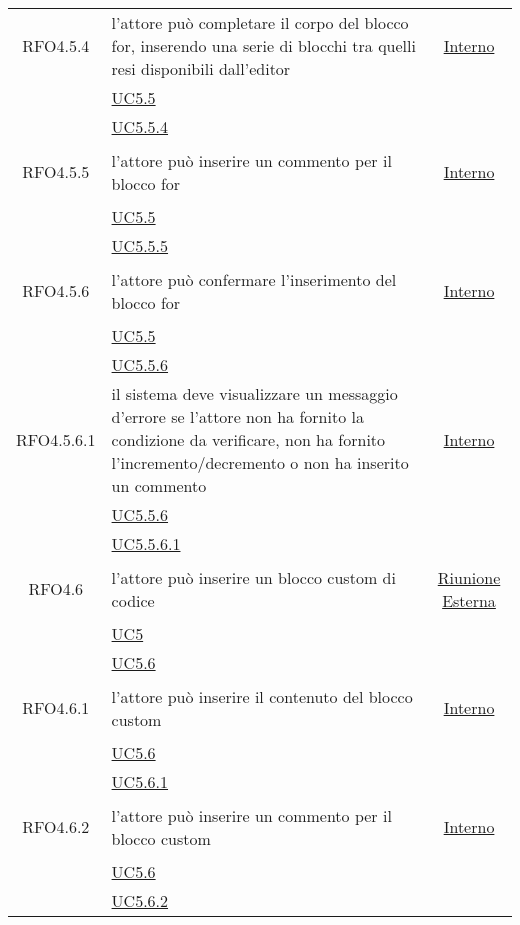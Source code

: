 \begin{longtable}{|c|>{\centering}m{7cm}|c|}
\hypertarget{RFO4.5.4}{RFO4.5.4} & l'attore può completare il corpo del blocco for, inserendo una serie di blocchi tra quelli resi disponibili dall'editor & \hyperlink{Interno}{Interno}\\
& \hyperref[UC5.5]{UC5.5}\\
& \hyperref[UC5.5.4]{UC5.5.4}\\ \hline

\hypertarget{RFO4.5.5}{RFO4.5.5} & l’attore può inserire un commento per il blocco for & \hyperlink{Interno}{Interno}\\
& \hyperref[UC5.5]{UC5.5}\\
& \hyperref[UC5.5.5]{UC5.5.5}\\ \hline

\hypertarget{RFO4.5.6}{RFO4.5.6} & l’attore può confermare l'inserimento del blocco for &  \hyperlink{Interno}{Interno}\\
& \hyperref[UC5.5]{UC5.5}\\
& \hyperref[UC5.5.6]{UC5.5.6}\\ \hline

\hypertarget{RFO4.5.6.1}{RFO4.5.6.1} & il sistema deve visualizzare un messaggio d'errore se l'attore non ha fornito la condizione da verificare, non ha fornito l'incremento/decremento o non ha inserito un commento & \hyperlink{Interno}{Interno}\\
& \hyperref[UC5.5.6]{UC5.5.6}\\
& \hyperref[UC5.5.6.1]{UC5.5.6.1}\\ \hline

\hypertarget{RFO4.6}{RFO4.6} & l'attore può inserire un blocco custom di codice & \hyperlink{Riunione Esterna}{Riunione Esterna}\\
& \hyperref[UC5]{UC5}\\
& \hyperref[UC5.6]{UC5.6}\\ \hline

\hypertarget{RFO4.6.1}{RFO4.6.1} & l'attore può inserire il contenuto del blocco custom & \hyperlink{Interno}{Interno}\\
& \hyperref[UC5.6]{UC5.6}\\
& \hyperref[UC5.6.1]{UC5.6.1}\\ \hline

\hypertarget{RFO4.6.2}{RFO4.6.2} & l’attore può inserire un commento per il blocco custom & \hyperlink{Interno}{Interno}\\
& \hyperref[UC5.6]{UC5.6}\\
& \hyperref[UC5.6.2]{UC5.6.2}\\ \hline


\end{longtable}
